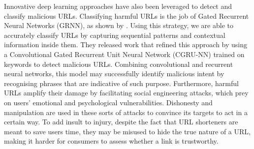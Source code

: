 Innovative deep learning approaches have also been leveraged to detect and classify malicious URLs. Classifying harmful URLs is the job of Gated Recurrent Neural Networks (GRNN), as shown by \cite{zhao2019classifying}. Using this strategy, we are able to accurately classify URLs by capturing sequential patterns and contextual information inside them. They released work that refined this approach by using a Convolutional Gated Recurrent Unit Neural Network (CGRU-NN) trained on keywords to detect malicious URLs. Combining convolutional and recurrent neural networks, this model may successfully identify malicious intent by recognising phrases that are indicative of such purpose. Furthermore, harmful URLs amplify their damage by facilitating social engineering attacks, which prey on users' emotional and psychological vulnerabilities. Dishonesty and manipulation are used in these sorts of attacks to convince its targets to act in a certain way. To add insult to injury, despite the fact that URL shorteners are meant to save users time, they may be misused to hide the true nature of a URL, making it harder for consumers to assess whether a link is trustworthy.
